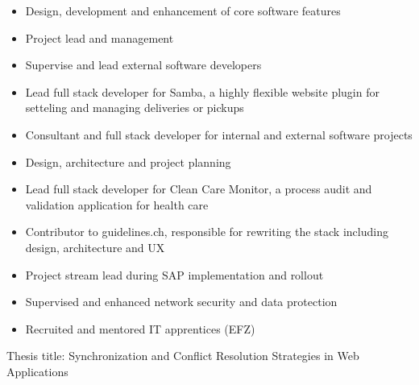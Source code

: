 \documentclass[10pt,a4paper]{altacv}
\begin{document}

\begin{fullwidth}
\makecvheader
\end{fullwidth}


\begin{itemize}
\item Design, development and enhancement of core software features
\item Project lead and management
\item Supervise and lead external software developers
\end{itemize}
\divider

\begin{itemize}
\item Lead full stack developer for Samba, a highly flexible website plugin for setteling and managing deliveries or pickups
\item Consultant and full stack developer for internal and external software projects
\end{itemize}
\divider

\begin{itemize}
\item Design, architecture and project planning
\item Lead full stack developer for Clean Care Monitor, a process audit and validation application for health care
\item Contributor to guidelines.ch, responsible for rewriting the stack including design, architecture and UX
\end{itemize}
\divider

\begin{itemize}
\item Project stream lead during SAP implementation and rollout
\item Supervised and enhanced network security and data protection
\item Recruited and mentored IT apprentices (EFZ)
\end{itemize}
\divider


Thesis title: Synchronization and Conflict Resolution Strategies in Web Applications
\divider

\end{document}
